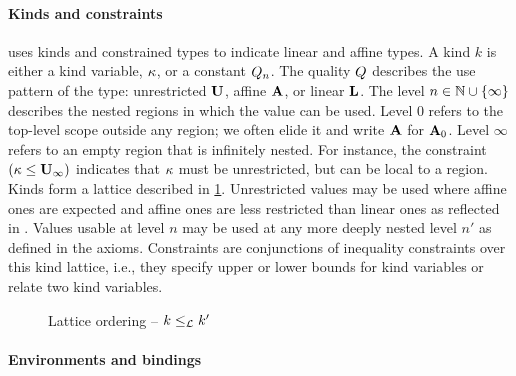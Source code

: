 \paragraph{Kinds and constraints}

\affe uses kinds and constrained types to indicate
linear and affine types.
A kind $k$ is either a kind variable, $\kappa$, or a constant $Q_n$.
The quality $Q$ describes the use pattern of the type:
unrestricted $\mathbf{U}$, affine $\mathbf{A}$, or linear $\mathbf{L}$. The level $n \in \mathbb{N} \cup \{\infty\}$
describes the nested regions in which the value can be used.
Level $0$ refers to the top-level scope outside any region; we often elide it
and write $\mathbf{A}$ for $\mathbf{A}_0$. Level
$\infty$ refers to an empty region that is infinitely nested.
For instance, the constraint $(\kappa \leq \mathbf{U}_\infty)$ indicates that
$\kappa$ must be unrestricted, but can be local to a region.
%
Kinds form a lattice described in \cref{sdtyp:lattice}.
Unrestricted values may be used
where affine ones are expected and affine ones are less restricted
than linear ones as reflected in .
Values usable at level $n$ may be used at any more deeply
nested level $n'$ as defined in the  axioms.
%
Constraints are conjunctions of inequality constraints over this kind
lattice, i.e., they specify upper or lower bounds for
kind variables or relate two kind variables.

\begin{figure}[tp]
  
  \vspace{-10pt}
  \caption{Lattice ordering -- $k \leq_\mathcal L k'$}
  \label{sdtyp:lattice}
  \vspace{-10pt}
\end{figure}

\paragraph{Environments and bindings}
\label{sdtyping:envs}

